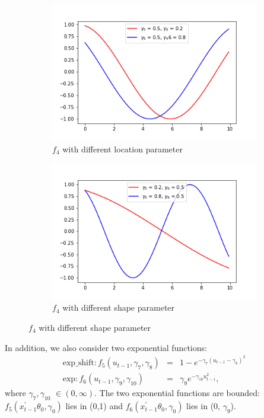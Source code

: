 \documentclass[a4paper,12pt,times,numbered,print,index]{report}
\numberwithin{equation}{section}
\begin{document}
\begin{figure}[!htbp]
	\centering
	\caption{Plots for Trigonometric Functions}
	\begin{subfigure}[b]{0.44\linewidth}
		\includegraphics[width=\linewidth]{plots/scale_cos_g6.png}
		\caption{$f_{4}$ with different location parameter}
		\label{param_g6}
	\end{subfigure}
	\begin{subfigure}[b]{0.44\linewidth}
		\includegraphics[width=\linewidth]{plots/scale_cos_g5.png}
		\caption{$f_{4}$ with different shape parameter}
		\label{param_g5}
	\end{subfigure}
	\label{trigo}
\end{figure}

In addition, we also consider two exponential functions:
\begin{eqnarray*}
	\text{exp\_shift}: f_{5}\left( u_{t-1}, \gamma_{7}, \gamma_{8}\right) &=& 1-e^{-\gamma_{7}\left(u_{t-1}-\gamma_{8}\right)^{2}} \\
	\text{exp}: f_{6}\left( u_{t-1},\gamma _{9}, \gamma_{10}\right) &=& \gamma_{9} e^{-\gamma_{10}u_{t-1}^2},
\end{eqnarray*} 
where $\gamma_{7}, \gamma_{10}$ $\in(0, \infty)$. 
The two exponential functions are bounded: $f_{5}\left(x_{t-1}^{\prime }\theta _{0},\gamma_{0}\right)$ lies in (0,1) and $f_{6}\left(x_{t-1}^{\prime }\theta _{0},\gamma _{0}\right)$ lies in (0, $\gamma_{9}$). 
\end{document}

